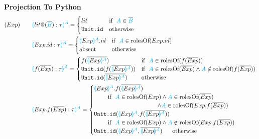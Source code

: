 \documentclass[11pt]{jarticle}
\newcommand{\projection}[2]{{\color{cyan}\llparenthesis}#1{\color{cyan}\rrparenthesis^#2}}
\newcommand{\gray}[1]{\textbf{\textsf{\color{Gray}#1}}}
\begin{document}
{\bf Projection To Python}
\begin{alignat*}{2}
  &(Exp)~~~ &&\projection{lit\gray{@}(\overline{\color{cyan}{B}}):\tau}{A}=
  \begin{cases}
    lit & \text{if}~~ {\color{cyan}A} \in \overline{\color{cyan}{B}}\\
    \texttt{Unit.id} &\text{otherwise}
  \end{cases}\\
  &&&\projection{Exp.id:\tau}{A}=
  \begin{cases}
    \projection{Exp}{A}.id &\text{if}~~{\color{cyan}A} \in \text{rolesOf} (Exp.id)\\
    \text{absent} &\text{otherwise}
  \end{cases}\\
  &&&\projection{f(\overline{Exp}):\tau}{A} =
  \begin{cases}
    f(\overline{\projection{Exp}{A}}) &\text{if}~~ {\color{cyan}A} \in \text{rolesOf} (f(\overline{Exp}))\\
    \texttt{Unit.id}(f(\overline{\projection{Exp}{A}})) &\text{if}~~ {\color{cyan}A} \in \text{rolesOf}(\overline{Exp}) \wedge {\color{cyan}A} \notin \text{rolesOf} (f(\overline{Exp}))\\
    \texttt{Unit.id}(\overline{\projection{Exp}{A}}) &\text{otherwise}
  \end{cases}\\
  &&&\projection{Exp.f(\overline{Exp}):\tau}{A}=
  \begin{cases}
    \projection{Exp}{A}.f(\overline{\projection{Exp}{A}}) \\
    ~~~~~~~\text{if}~~ {\color{cyan}A} \in \text{rolesOf}(Exp) \wedge {\color{cyan}A} \in \text{rolesOf}(\overline{Exp})\\
    ~~~~~~~~~~~~~~~~~~~~~~~~~~~~~~~~ \wedge {\color{cyan}A} \in \text{rolesOf}(Exp.f(\overline{Exp}))\\
    \texttt{Unit.id}(\projection{Exp}{A}.f(\overline{\projection{Exp}{A}})) \\
    ~~~~~~~\text{if}~~ {\color{cyan}A} \in \text{rolesOf}(Exp) \wedge {\color{cyan}A} \notin \text{rolesOf}(Exp.f(\overline{Exp}))\\
    \texttt{Unit.id}(\projection{Exp}{A},\overline{\projection{Exp}{A}}) ~~~~~\text{otherwise}
  \end{cases}\\

\end{alignat*}
\end{document}

